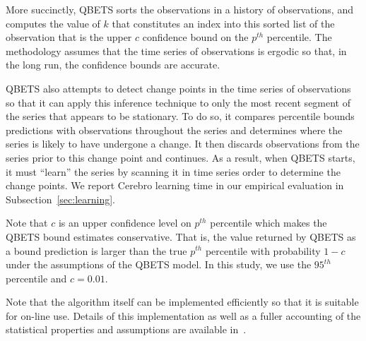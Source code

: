 More succinctly, QBETS sorts the observations in a history of observations,
and computes the value of $k$ that constitutes an index into 
this sorted list of the observation that is the upper $c$ confidence bound on
the $p^{th}$ percentile. The methodology assumes that the time series of 
observations is 
ergodic so that, in the long run, the confidence bounds are accurate.  

QBETS also attempts to detect change points in the time series of observations 
so that it can apply this inference technique to only the most recent 
segment of the series that appears to be stationary.  
To do so, it compares
percentile bounds predictions with observations throughout the series and
determines where the series is likely to have undergone a change.  It then
discards observations from the series prior to this change point and
continues.  As a result, when QBETS starts, it must ``learn'' the series by
scanning it in time series order to determine the change points.  We report
Cerebro learning time in our empirical evaluation in
Subsection~\ref{sec:learning}.


Note that $c$ is an upper confidence level on $p^{th}$ percentile
which makes the QBETS
bound estimates conservative.  That is, the value returned by QBETS as a bound
prediction is larger than the true $p^{th}$ percentile with probability $1-c$
under the assumptions of the QBETS model. 
In this study, we use the $95^{th}$ percentile and $c = 0.01$.

Note that the algorithm itself can be implemented efficiently so that it is
suitable for on-line use.  Details of this implementation as well as a fuller
accounting of the statistical properties and assumptions are available
in~\cite{Nurmi:2007:QQB:1791551.1791556,uptime-bootstrap,quant-est,ckpt-sched}.


